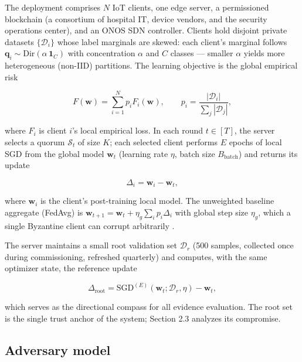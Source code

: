 \documentclass[cmc,article,submit,moreauthors,pdftex]{Definitions/tsp}
\begin{document}
The deployment comprises $N$ IoT clients, one edge server, a permissioned blockchain (a consortium of hospital IT, device vendors, and the security operations center), and an ONOS SDN controller. Clients hold disjoint private datasets $\{\mathcal{D}_i\}$ whose label marginals are skewed: each client's marginal follows $\mathbf{q}_i \sim \mathrm{Dir}(\alpha\,\mathbf{1}_C)$ with concentration $\alpha$ and $C$ classes --- smaller $\alpha$ yields more heterogeneous (non-IID) partitions. The learning objective is the global empirical risk

\begin{equation}
F(\mathbf{w}) = \sum_{i=1}^{N} p_i F_i(\mathbf{w}), \qquad p_i = \frac{|\mathcal{D}_i|}{\sum_j |\mathcal{D}_j|},
\tag{1}
\end{equation}

where $F_i$ is client $i$'s local empirical loss. In each round $t \in [T]$, the server selects a quorum $\mathcal{S}_t$ of size $K$; each selected client performs $E$ epochs of local SGD from the global model $\mathbf{w}_t$ (learning rate $\eta$, batch size $B_{\mathrm{batch}}$) and returns its update

\begin{equation}
\Delta_i = \mathbf{w}_i - \mathbf{w}_t,
\tag{2}
\end{equation}

where $\mathbf{w}_i$ is the client's post-training local model. The unweighted baseline aggregate (FedAvg) is $\mathbf{w}_{t+1} = \mathbf{w}_t + \eta_g\sum_i p_i\Delta_i$ with global step size $\eta_g$, which a single Byzantine client can corrupt arbitrarily \cite{ref-14}.

The server maintains a small root validation set $\mathcal{D}_r$ (500 samples, collected once during commissioning, refreshed quarterly) and computes, with the same optimizer state, the reference update

\begin{equation}
\Delta_{\mathrm{root}} = \mathrm{SGD}^{(E)}(\mathbf{w}_t; \mathcal{D}_r, \eta) - \mathbf{w}_t,
\tag{3}
\end{equation}

which serves as the directional compass for all evidence evaluation. The root set is the single trust anchor of the system; Section 2.3 analyzes its compromise.

\subsection{Adversary model}\label{sec:adversary-model}
\end{document}
